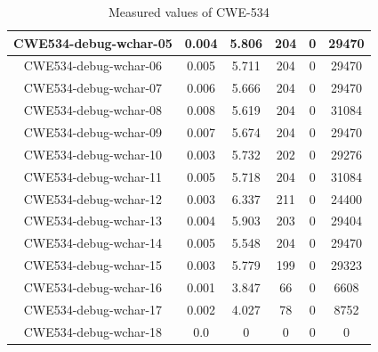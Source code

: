 \begin{table}[h!]
\begin{tabular}{||c |c |c |c |c| c||}
 CWE534-debug-wchar-05 & 0.004 & 5.806 & 204&0& 29470\\ 
 \hline
 CWE534-debug-wchar-06 & 0.005 & 5.711 & 204&0& 29470\\ 
 \hline
 CWE534-debug-wchar-07 & 0.006 & 5.666 & 204&0& 29470\\ 
 \hline
 CWE534-debug-wchar-08 & 0.008 & 5.619 & 204&0& 31084\\ 
 \hline
 CWE534-debug-wchar-09 & 0.007 & 5.674 & 204&0& 29470\\ 
 \hline
 CWE534-debug-wchar-10 & 0.003 & 5.732 & 202&0&29276 \\ 
 \hline
 CWE534-debug-wchar-11 & 0.005 & 5.718 &204&0&31084 \\ 
 \hline
 CWE534-debug-wchar-12 & 0.003 &6.337 &211&0& 24400\\ 
 \hline
 CWE534-debug-wchar-13 & 0.004 & 5.903 & 203&0& 29404\\ 
 \hline
 CWE534-debug-wchar-14 & 0.005 & 5.548 & 204&0& 29470\\ 
 \hline
 CWE534-debug-wchar-15 & 0.003 & 5.779 & 199&0&29323\\ 
 \hline
  CWE534-debug-wchar-16 & 0.001 & 3.847 & 66&0& 6608\\ 
 \hline
  CWE534-debug-wchar-17 & 0.002 & 4.027 & 78&0& 8752\\ 
 \hline
  CWE534-debug-wchar-18 & 0.0 & 0 & 0&0& 0\\
 \hline
 \hline
\end{tabular}
\caption{Measured values of CWE-534}
\label{table:times}
\end{table}


